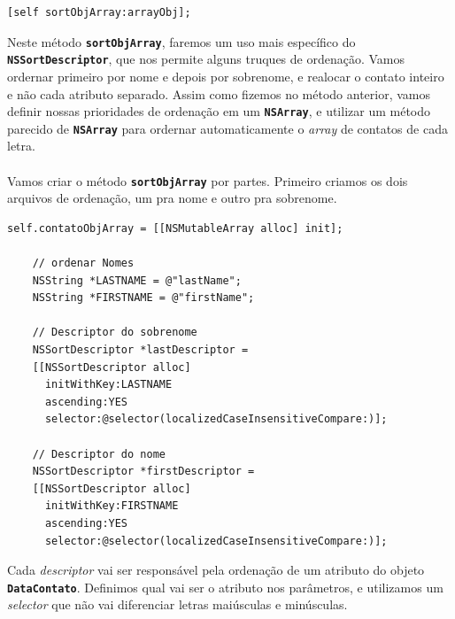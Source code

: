 \documentclass[a4paper,12pt,brazil,doubleside]{book}
\begin{document}
\begin{listing}
\begin{verbatim}
[self sortObjArray:arrayObj];
\end{verbatim}
\end{listing}

Neste método \texttt{\textbf{sortObjArray}}, faremos um uso mais específico do \texttt{\textbf{NSSortDescriptor}}, que nos permite alguns truques de ordenação. Vamos ordernar primeiro por nome e depois por sobrenome, e realocar o contato inteiro e não cada atributo separado. Assim como fizemos no método anterior, vamos definir nossas prioridades de ordenação em um \texttt{\textbf{NSArray}}, e utilizar um método parecido de \texttt{\textbf{NSArray}} para ordernar automaticamente o \emph{array} de contatos de cada letra.\\
\paragraph{}Vamos criar o método \texttt{\textbf{sortObjArray}} por partes. Primeiro criamos os dois arquivos de ordenação, um pra nome e outro pra sobrenome.

\begin{listing}
\begin{verbatim}
self.contatoObjArray = [[NSMutableArray alloc] init];
    
    // ordenar Nomes
    NSString *LASTNAME = @"lastName";
    NSString *FIRSTNAME = @"firstName";
    
    // Descriptor do sobrenome
    NSSortDescriptor *lastDescriptor =
    [[NSSortDescriptor alloc]
      initWithKey:LASTNAME
      ascending:YES
      selector:@selector(localizedCaseInsensitiveCompare:)];
    
    // Descriptor do nome
    NSSortDescriptor *firstDescriptor =
    [[NSSortDescriptor alloc]
      initWithKey:FIRSTNAME
      ascending:YES
      selector:@selector(localizedCaseInsensitiveCompare:)];
\end{verbatim}
\end{listing}

Cada \emph{descriptor} vai ser responsável pela ordenação de um atributo do objeto \texttt{\textbf{DataContato}}. Definimos qual vai ser o atributo nos parâmetros, e utilizamos um \emph{selector} que não vai diferenciar letras maiúsculas e minúsculas.
\end{document}
